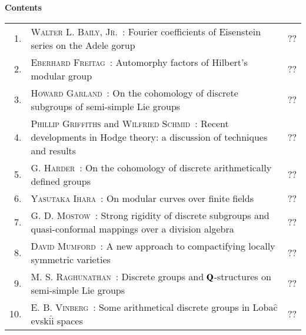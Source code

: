 
\thispagestyle{empty}

\noindent
{\bf\huge Contents}

\vskip 1cm


\noindent
\renewcommand{\arraystretch}{1.7}
\begin{longtable}[l]{r>{\raggedright}p{9cm}r}
1. & \textsc{Walter L. Baily, Jr.~:} Fourier coefficients of Eisenstein series on the Adele gorup & ?? \\
2. & \textsc{Eberhard Freitag~:} Automorphy factors of Hilbert's modular group & ?? \\
3. & \textsc{Howard Garland~:} On the cohomology of discrete subgroups of semi-simple Lie groups & ?? \\
4. & \textsc{Phillip Griffiths} and \textsc{Wilfried Schmid~:} Recent developments in Hodge theory: a discussion of techniques and results & ?? \\
5. & \textsc{G. Harder~:} On the cohomology of discrete arithmetically defined groups & ?? \\
6. & \textsc{Yasutaka Ihara~:} On modular curves over finite fields & ?? \\
7. & \textsc{G. D. Mostow~:} Strong rigidity of discrete subgroups and quasi-conformal mappings over a division algebra & ?? \\
8. & \textsc{David Mumford~:} A new approach to compactifying locally symmetric varieties & ?? \\
9. &  \textsc{M. S. Raghunathan~:} Discrete groups and $\mathbf{Q}$-structures on semi-simple Lie groups & ?? \\
10. &  \textsc{E. B. Vinberg~:} Some arithmetical discrete groups in Loba$\hat{\text{c}}$evski$\hat{\text{i}}$ spaces & ?? 
\end{longtable}

\thispagestyle{empty}
